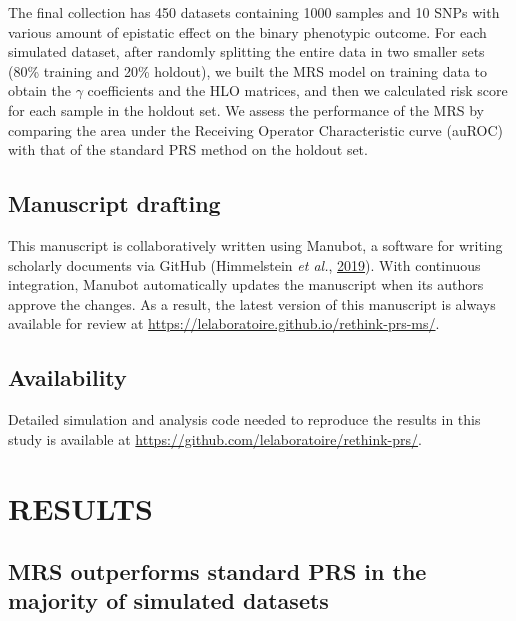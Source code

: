\documentclass[a4paper,twoside, 9pt]{article}
\begin{document}
The final collection has 450 datasets containing 1000 samples and 10
SNPs with various amount of epistatic effect on the binary phenotypic
outcome. For each simulated dataset, after randomly splitting the entire
data in two smaller sets (80\% training and 20\% holdout), we built the
MRS model on training data to obtain the \(\gamma\) coefficients and the
HLO matrices, and then we calculated risk score for each sample in the
holdout set. We assess the performance of the MRS by comparing the area
under the Receiving Operator Characteristic curve (auROC) with that of
the standard PRS method on the holdout set.

\subsection{Manuscript drafting}\label{manuscript-drafting}

\noindent This manuscript is collaboratively written using Manubot, a software for
writing scholarly documents via GitHub (Himmelstein \emph{et al.},
\protect\hyperlink{ref-YuJbg3zO}{2019}). With continuous integration,
Manubot automatically updates the manuscript when its authors approve
the changes. As a result, the latest version of this manuscript is
always available for review at
\url{https://lelaboratoire.github.io/rethink-prs-ms/}.


\subsection{Availability}\label{availability}

\noindent Detailed simulation and analysis code needed to reproduce the results in
this study is available at
\url{https://github.com/lelaboratoire/rethink-prs/}.

\section{\uppercase{Results}}
\subsection{MRS outperforms standard PRS in the majority of simulated
datasets}\label{mrs-outperforms-standard-prs-in-the-majority-of-simulated-datasets}
\end{document}
